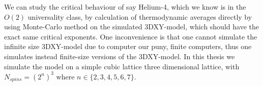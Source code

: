 We can study the critical behaviour of say Helium-4, which we know is in the $O(2)$ universality class, by calculation of thermodynamic averages directly by using Monte-Carlo method on the simulated 3DXY-model, which should have the exact same critical exponents. 
One inconvenience is that one cannot simulate the infinite size 3DXY-model due to computer our puny, finite computers, thus one simulates instead finite-size versions of the 3DXY-model.
In this thesis we simulate the model on a simple cubic lattice three dimensional lattice, with $N_{spins} = (2^n)^3$ where $n \in \{2,3,4,5,6,7\}$.
